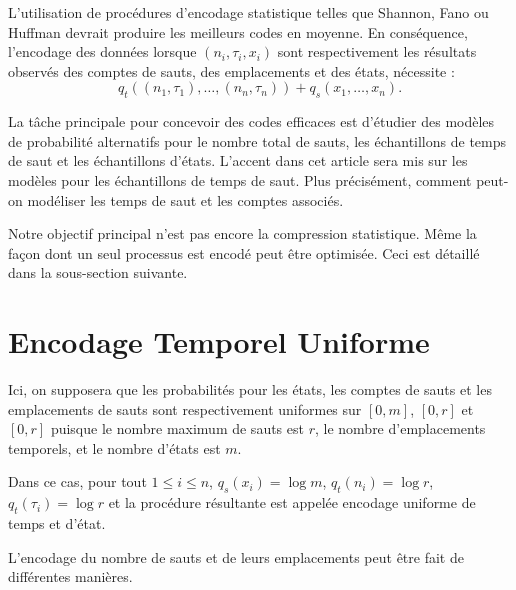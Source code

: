 \documentclass[11pt,a4paper]{article}
\begin{document}
	L'utilisation de procédures d'encodage statistique telles que Shannon, Fano ou Huffman devrait produire les meilleurs codes en moyenne. En conséquence, l'encodage des données lorsque $(n_i,\tau_i,x_i)$ sont respectivement les résultats observés des comptes de sauts, des emplacements et des états, nécessite :
	\begin{equation}
		q_t((n_1,\tau_1),\dots,(n_n,\tau_n)) + q_s(x_1,\dots,x_n).
	\end{equation}
	
	La tâche principale pour concevoir des codes efficaces est d'étudier des modèles de probabilité alternatifs pour le nombre total de sauts, les échantillons de temps de saut et les échantillons d'états. L'accent dans cet article sera mis sur les modèles pour les échantillons de temps de saut. Plus précisément, comment peut-on modéliser les temps de saut et les comptes associés.
	
	Notre objectif principal n'est pas encore la compression statistique. Même la façon dont un seul processus est encodé peut être optimisée. Ceci est détaillé dans la sous-section suivante.
	
	\section{Encodage Temporel Uniforme}
	\label{sec:encodage_uniforme}
	
	Ici, on supposera que les probabilités pour les états, les comptes de sauts et les emplacements de sauts sont respectivement uniformes sur $[0,m]$, $[0,r]$ et $[0,r]$ puisque le nombre maximum de sauts est $r$, le nombre d'emplacements temporels, et le nombre d'états est $m$.
	
	Dans ce cas, pour tout $1 \leq i \leq n$, $q_s(x_i) = \log m$, $q_t(n_i) = \log r$, $q_t(\tau_i) = \log r$ et la procédure résultante est appelée encodage uniforme de temps et d'état.
	
	L'encodage du nombre de sauts et de leurs emplacements peut être fait de différentes manières.
	
\end{document}
